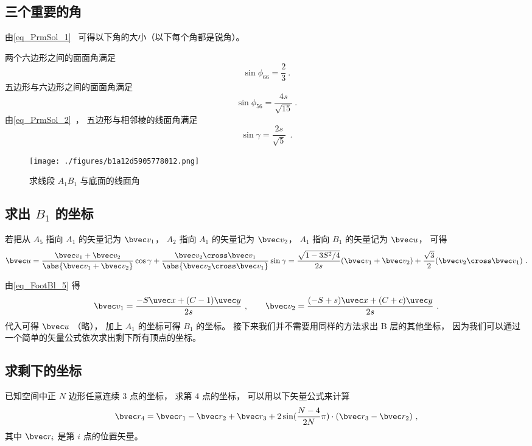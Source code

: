 \subsection{三个重要的角}
由\autoref{eq_PrmSol_1}~ 可得以下角的大小（以下每个角都是锐角）。

两个六边形之间的面面角满足
\begin{equation}
\sin\phi_{66} = \frac{2}{3}~.
\end{equation}
五边形与六边形之间的面面角满足
\begin{equation}
\sin\phi_{56} = \frac{4s}{\sqrt{15}}~.
\end{equation}
由\autoref{eq_PrmSol_2}~， 五边形与相邻棱的线面角满足 %
\begin{equation}
\sin\gamma = \frac{2s}{\sqrt5}~~.
\end{equation}

\begin{figure}[ht]
\centering
\texttt{[image: ./figures/b1a12d5905778012.png]}
\caption{求线段 $A_1 B_1$ 与底面的线面角} \label{fig_FootBl_4}
\end{figure}

\subsection{求出 $B_1$ 的坐标}

若把从 $A_5$ 指向 $A_1$ 的矢量记为 $\bvec v_1$， $A_2$ 指向 $A_1$ 的矢量记为 $\bvec v_2$， $A_1$ 指向 $B_1$ 的矢量记为 $\bvec u$， 可得
\begin{equation}
\bvec u = \frac{\bvec v_1 + \bvec v_2}{\abs{\bvec v_1 + \bvec v_2}} \cos\gamma
+ \frac{\bvec v_2 \cross \bvec v_1}{\abs{\bvec v_2 \cross \bvec v_1}} \sin\gamma
= \frac{\sqrt{1 - 3S^2/4}}{2s} (\bvec v_1 + \bvec v_2) + \frac{\sqrt{3}}{2} (\bvec v_2 \cross \bvec v_1)~.
\end{equation}

由\autoref{eq_FootBl_5} 得
\begin{equation}
\bvec v_1 = \frac{-S \uvec x + (C-1)\uvec y}{2s} ~,\qquad
\bvec v_2 = \frac{(-S+s)\uvec x + (C+c)\uvec y}{2s}~.
\end{equation}
代入可得 $\bvec u$ （略）， 加上 $A_1$ 的坐标可得 $B_1$ 的坐标。 接下来我们并不需要用同样的方法求出 B 层的其他坐标， 因为我们可以通过一个简单的矢量公式依次求出剩下所有顶点的坐标。

\subsection{求剩下的坐标}
已知空间中正 $N$ 边形任意连续 3 点的坐标， 求第 4 点的坐标， 可以用以下矢量公式来计算
\begin{equation}\label{eq_FootBl_9}
\bvec r_4 = \bvec r_1 - \bvec r_2 + \bvec r_3 + 2\sin(\frac{N-4}{2N}\pi) \cdot (\bvec r_3  - \bvec r_2)~,
\end{equation}
其中 $\bvec r_i$ 是第 $i$ 点的位置矢量。

